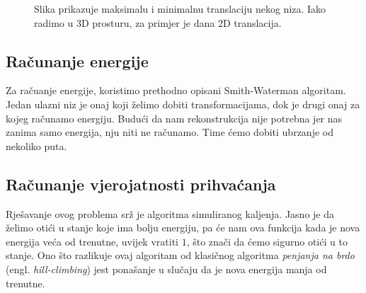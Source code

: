 \documentclass[times, utf8, zavrsni]{fer}
\begin{document}
\begin{figure}
\centering
{}
\caption[Translacija nizova]{Slika prikazuje
maksimalu i minimalnu translaciju nekog niza. 
Iako radimo u 3D prosturu, za primjer je dana 2D
translacija.}
\label{figure:susjed:translacija}
\end{figure}

\subsection{Računanje energije}
Za račuanje energije, koristimo prethodno opisani Smith-Waterman algoritam. 
Jedan ulazni niz je onaj koji želimo dobiti transformacijama, dok je drugi
onaj za kojeg računamo energiju. 
Budući da nam rekonstrukcija nije potrebna jer nas zanima samo energija,
nju niti ne računamo. Time ćemo dobiti ubrzanje od nekoliko puta.


\subsection{Računanje vjerojatnosti prihvaćanja}
Rješavanje ovog problema srž je algoritma simuliranog kaljenja. 
Jasno je da želimo otići u stanje koje ima bolju energiju, pa
će nam ova funkcija kada je nova energija veća od trenutne, uvijek
vratiti $1$, što znači da ćemo sigurno otići u to stanje. 
Ono što razlikuje ovaj algoritam od klasičnog algoritma
\textit{penjanja na brdo} (engl. \textit{hill-climbing}) jest 
ponašanje u slučaju da je nova energija manja od trenutne. 
\end{document}
